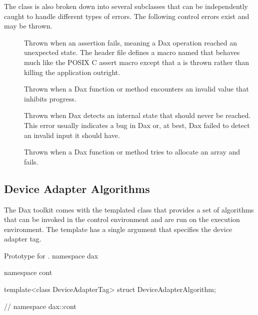 The  class is also broken down into several
subclasses that can be independently caught to handle different types of
errors. The following control errors exist and may be thrown.
\begin{description}
\item[]  Thrown when an assertion
  fails, meaning a Dax operation reached an unexpected state. The header
  file  defines a macro named
   that behaves much like the POSIX C assert
  macro except that a  is thrown rather
  than killing the application outright.
\item[] Thrown when a Dax function or method
  encounters an invalid value that inhibits progress.
\item[] Thrown when Dax detects an internal
  state that should never be reached. This error usually indicates a bug in
  Dax or, at best, Dax failed to detect an invalid input it should have.
\item[] Thrown when a Dax function or
  method tries to allocate an array and fails.
\end{description}



\subsection{Device Adapter Algorithms}
\label{sec:DeviceAdapterAlgorithms}


The Dax toolkit comes with the templated class
 that provides a set of algorithms that can
be invoked in the control environment and are run on the execution
environment. The template has a single argument that specifies the device
adapter tag.

\begin{daxexample}{Prototype for \protect{}.}
namespace dax {
namespace cont {

template<class DeviceAdapterTag>
struct DeviceAdapterAlgorithm;

}
} // namespace dax::cont
\end{daxexample}

